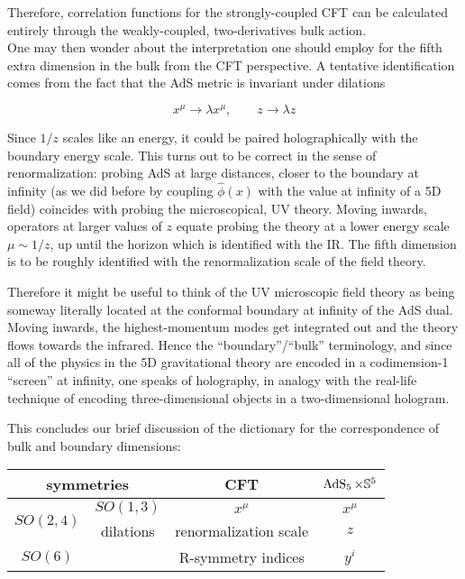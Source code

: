 Therefore, correlation functions for the strongly-coupled CFT can be calculated entirely through the weakly-coupled, two-derivatives bulk action.\\

One may then wonder about the interpretation one should employ for the fifth extra dimension in the bulk from the CFT perspective. A tentative identification comes from the fact that the AdS metric is invariant under dilations

\begin{equation}
	x^\mu \rightarrow \lambda x^\mu, \quad \quad z \rightarrow \lambda z
	\label{}
\end{equation}

Since $1/z$ scales like an energy, it could be paired holographically with the boundary energy scale. This turns out to be correct in the sense of renormalization: probing AdS at large distances, closer to the boundary at infinity (as we did before by coupling $\hat\phi(x)$ with the value at infinity of a 5D field) coincides with probing the microscopical, UV theory. Moving inwards, operators at larger values of $z$ equate probing the theory at a lower energy scale $\mu \sim 1/z$, up until the horizon which is identified with the IR. The fifth dimension is to be roughly identified with the renormalization scale of the field theory.

Therefore it might be useful to think of the UV microscopic field theory as being someway literally located at the conformal boundary at infinity of the AdS dual. Moving inwards, the highest-momentum modes get integrated out and the theory flows towards the infrared. Hence the ``boundary''/``bulk'' terminology, and since all of the physics in the 5D gravitational theory are encoded in a codimension-1 ``screen'' at infinity, one speaks of holography, in analogy with the real-life technique of encoding three-dimensional objects in a two-dimensional hologram.

This concludes our brief discussion of the dictionary for the correspondence of bulk and boundary dimensions:

\begin{center}
	\begin{tabular}{cc|c|c}
		\multicolumn{2}{c|}{symmetries}	 & CFT & $\operatorname{AdS}_{5} \times \mathbb{S}^5$\\ \midrule\midrule
		\multirow{2}{*}{$SO(2,4)$} & $SO(1,3)$ & $x^\mu$ & $x^\mu$ \\
	& dilations & renormalization scale & $z$ \\
	$SO(6)$ & & R-symmetry indices & $y^i$
	\end{tabular}
\end{center}

